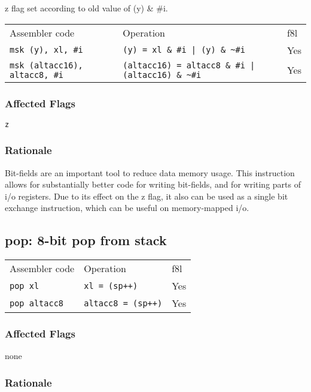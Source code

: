 \documentclass{book}
\begin{document}
z flag set according to old value of  (y) \& \#i.

\begin{tabular}{l l l}
Assembler code                        & Operation                                                    & f8l \\
\texttt{msk (y), xl, \#i}             & \texttt{(y) = xl \& \#i | (y) \& \~{}\#i}                    & Yes \\
\texttt{msk (altacc16), altacc8, \#i} & \texttt{(altacc16) = altacc8 \& \#i | (altacc16) \& \~{}\#i} & Yes \\
\end{tabular}

\subsubsection*{Affected Flags}

\texttt{z}

\subsubsection*{Rationale}

Bit-fields are an important tool to reduce data memory usage. This instruction allows for substantially better code for writing bit-fields, and for writing parts of i/o registers. Due to its effect on the z flag, it also can be used as a single bit exchange instruction, which can be useful on memory-mapped i/o.

\subsection{pop: 8-bit pop from stack}

\begin{tabular}{l l l}
Assembler code       & Operation                 & f8l \\
\texttt{pop xl}      & \texttt{xl = (sp++)}      & Yes \\
\texttt{pop altacc8} & \texttt{altacc8 = (sp++)} & Yes \\
\end{tabular}

\subsubsection*{Affected Flags}

none

\subsubsection*{Rationale}
\end{document}
